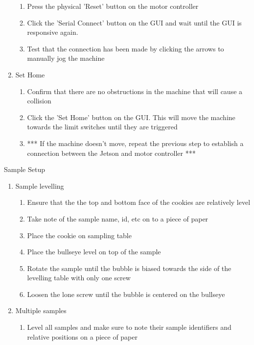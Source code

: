 \documentclass{article}
\begin{document}
\begin{outline}[enumerate]
\begin{enumerate}
        \begin{enumerate}
        \item Press the physical 'Reset' button on the motor controller
        \item Click the 'Serial Connect' button on the GUI and wait until the GUI is responsive again.
        \item Test that the connection has been made by clicking the arrows to manually jog the machine 
        \end{enumerate}
    \item Set Home
        \begin{enumerate}
        \item Confirm that there are no obstructions in the machine that will cause a collision
        \item Click the 'Set Home' button on the GUI. This will move the machine towards the limit switches until they are triggered
        \item *** If the machine doesn't move, repeat the previous step to establish a connection between the Jetson and motor controller ***
        \end{enumerate}
\end{enumerate}
\item Sample Setup
	\begin{enumerate}
	\item Sample levelling
		\begin{enumerate}
		\item Ensure that the the top and bottom face of the cookies are relatively level
        \item Take note of the sample name, id, etc on to a piece of paper
		\item Place the cookie on sampling table
		\item Place the bullseye level on top of the sample
        \item Rotate the sample until the bubble is biased towards the side of the levelling table with only one screw
        \item Loosen the lone screw until the bubble is centered on the bullseye
		\end{enumerate}
	\item Multiple samples
		\begin{enumerate}
		\item Level all samples and make sure to note their sample identifiers and relative positions on a piece of paper 
		\end{enumerate}

\end{enumerate}
\end{outline}
\end{document}
